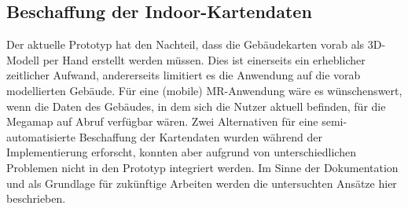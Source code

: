\subsection*{Beschaffung der Indoor-Kartendaten}
Der aktuelle Prototyp hat den Nachteil, dass die Gebäudekarten vorab als 3D-Modell per Hand erstellt werden müssen.
Dies ist einerseits ein erheblicher zeitlicher Aufwand, andererseits limitiert es die Anwendung auf die vorab modellierten Gebäude.
Für eine (mobile) MR-Anwendung wäre es wünschenswert, wenn die Daten des Gebäudes, in dem sich die Nutzer aktuell befinden, für die Megamap auf Abruf verfügbar wären.
Zwei Alternativen für eine semi-automatisierte Beschaffung der Kartendaten wurden während der Implementierung erforscht, konnten aber aufgrund von unterschiedlichen Problemen nicht in den Prototyp integriert werden.
Im Sinne der Dokumentation und als Grundlage für zukünftige Arbeiten werden die untersuchten Ansätze hier beschrieben.

